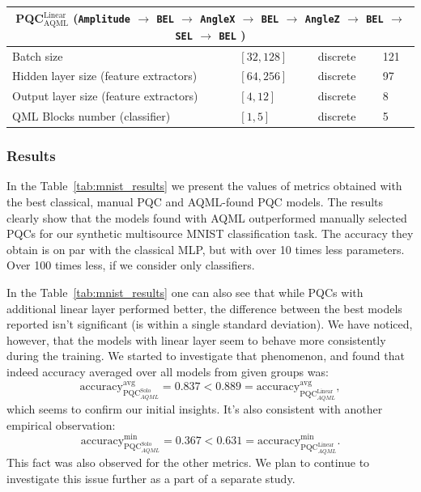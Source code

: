 \documentclass[runningheads]{llncs}
\begin{document}
\begin{table}[t]
\begin{tabular}{p{6cm}p{2cm}p{1.5cm}l}
		\hline
		\multicolumn{4}{c}{PQC$^{\mathrm{Linear}}_{\mathrm{AQML}}$
			(\texttt{Amplitude} $\to$ \texttt{BEL} $\to$ \texttt{AngleX} $\to$ \texttt{BEL} $\to$ \texttt{AngleZ}
		$\to$ \texttt{BEL} $\to$ \texttt{SEL} $\to$ \texttt{BEL} )}                                                                                         \\
		\hline
		Batch size                                         & $[32, 128]$    & discrete      & 121                                                           \\
		Hidden layer size (feature extractors)             & $[64, 256]$    & discrete      & 97                                                            \\
		Output layer size (feature extractors)             & $[4, 12]$      & discrete      & 8                                                             \\
		QML Blocks number (classifier)                     & $[1, 5]$       & discrete      & 5                                                             \\
		\hline
	\end{tabular}
\end{table}

\subsubsection{Results}

In the Table~\ref{tab:mnist_results} we present the values of metrics obtained with the best classical, manual PQC and
AQML-found PQC models. The results clearly show that the models found with AQML outperformed manually selected PQCs
for our synthetic multisource MNIST classification task. The accuracy they obtain is on par with the classical MLP,
but with over 10 times less parameters. Over 100 times less, if we consider only classifiers.

In the Table~\ref{tab:mnist_results} one can also see that while PQCs with additional linear layer performed better,
the difference between the best models reported isn't significant (is within a single standard deviation). We have
noticed, however, that the models with linear layer seem to behave more consistently during the training. We started
to investigate that phenomenon, and found that indeed accuracy averaged over all models from given groups was:
\begin{equation}
	\mathrm{accuracy}^{\mathrm{avg}}_{\mathrm{PQC}^{\mathrm{Solo}}_{AQML}}
	= 0.837 < 0.889 =
	\mathrm{accuracy}^{\mathrm{avg}}_{\mathrm{PQC}^{\mathrm{Linear}}_{AQML}},
\end{equation}
which seems to confirm our initial insights. It's also consistent with another empirical observation:
\begin{equation}
	\mathrm{accuracy}^{\mathrm{min}}_{\mathrm{PQC}^{\mathrm{Solo}}_{AQML}}
	= 0.367 < 0.631 =
	\mathrm{accuracy}^{\mathrm{min}}_{\mathrm{PQC}^{\mathrm{Linear}}_{AQML}}.
\end{equation}
This fact was also observed for the other metrics. We plan to continue to investigate this issue further as a part
of a separate study.
\end{document}
